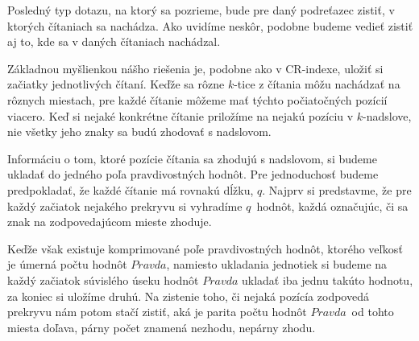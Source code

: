 Posledný typ dotazu, na ktorý sa pozrieme, bude pre daný podreťazec zistiť, v
ktorých čítaniach sa nachádza. Ako uvidíme neskôr, podobne budeme vedieť zistiť
aj to, kde sa v daných čítaniach nachádzal.

Základnou myšlienkou nášho riešenia je, podobne ako v CR-indexe, uložiť si
začiatky jednotlivých čítaní. Keďže sa rôzne $k$-tice z čítania môžu nachádzať
na rôznych miestach, pre každé čítanie môžeme mať týchto počiatočných pozícií viacero.
Keď si nejaké konkrétne čítanie priložíme na nejakú pozíciu v $k$-nadslove,
nie všetky jeho znaky sa budú zhodovať s nadslovom.

Informáciu o tom, ktoré pozície čítania sa zhodujú s nadslovom, si budeme ukladať
do jedného poľa pravdivostných hodnôt. Pre jednoduchosť budeme predpokladať, že
každé čítanie má rovnakú dĺžku, $q$. Najprv si predstavme, že pre každý začiatok nejakého prekryvu si
vyhradíme $q$ hodnôt, každá označujúc, či sa znak na zodpovedajúcom mieste zhoduje.

Keďže však existuje komprimované poľe pravdivostných hodnôt,
ktorého veľkosť je úmerná počtu hodnôt $Pravda$, namiesto ukladania jednotiek
si budeme na každý začiatok súvislého úseku hodnôt $Pravda$ ukladať iba jednu takúto
hodnotu, za koniec si uložíme druhú. Na zistenie toho, či nejaká pozícía zodpovedá
prekryvu nám potom stačí zistiť, aká je parita počtu hodnôt $Pravda$ od tohto miesta
doľava, párny počet znamená nezhodu, nepárny zhodu.



